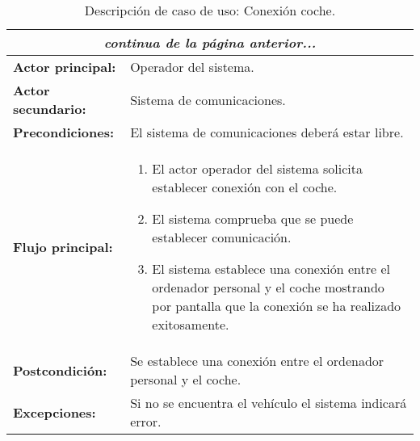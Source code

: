 \begin{table}[H]
  \begin{center}
    \begin{tabular}{|p{3.5cm}|p{10cm}|}
     \multicolumn{2}{c}{\emph{continua de la página anterior...}}\\
     \hline
      {\textbf{Actor principal:}} & { Operador del sistema.} \\
      \hline
      {\textbf{Actor secundario:}} & { Sistema de comunicaciones.} \\
     \hline
      {\textbf{Precondiciones:}} & { El sistema de comunicaciones deberá estar libre.} \\
     \hline     
     {\textbf{Flujo principal:}} & { 
\begin{enumerate}
\item El actor operador del sistema solicita establecer conexión con el coche.
\item El sistema comprueba que se puede establecer comunicación.
\item El sistema establece una conexión entre el ordenador personal y el coche mostrando por pantalla que la conexión se ha realizado exitosamente.
\end{enumerate}} \\
\hline
     {\textbf{Postcondición:}} & {Se establece una conexión entre el ordenador personal y el coche.}\\
     \hline
     {\textbf{Excepciones:}} & {Si no se encuentra el vehículo el sistema indicará error.}\\
     \hline
    \end{tabular}
  \end{center}
\caption{Descripción de caso de uso: Conexión coche.}
\end{table}



